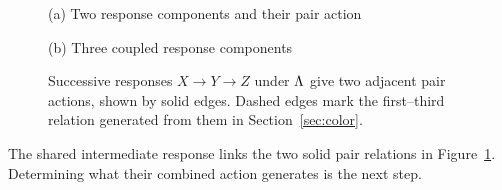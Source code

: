\begin{figure}[!htbp]
\centering
\begin{minipage}[t]{.495\linewidth}\centering
{}\par\smallskip
\small (a) Two response components and their pair action
\end{minipage}\hfill
\begin{minipage}[t]{.495\linewidth}\centering
{}\par\smallskip
\small (b) Three coupled response components
\end{minipage}
\caption{Successive responses $X\to Y\to Z$ under $\Lambda$ give two adjacent pair actions, shown by solid edges. Dashed edges mark the first--third relation generated from them in Section~\ref{sec:color}.}
\label{fig:couplings}
\end{figure}
\FloatBarrier

The shared intermediate response links the two solid pair relations in Figure~\ref{fig:couplings}. Determining what their combined action generates is the next step.
\FloatBarrier
